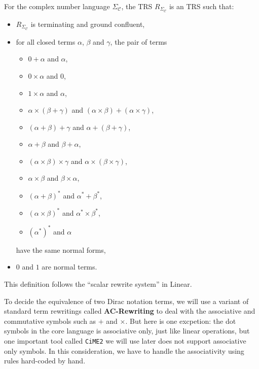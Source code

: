 \documentclass[manuscript, review, timestamp]{acmart}
\begin{document}
\begin{definition}
  For the complex number language $\Sigma_\mathcal{C}$, the TRS $R_{\Sigma_\mathcal{C}}$ is an TRS such that:
  \begin{itemize}
    \item $R_{\Sigma_\mathcal{C}}$ is terminating and ground confluent,
    \item for all closed terms $\alpha$, $\beta$ and $\gamma$, the pair of terms
    \begin{itemize}
        \item $0 + \alpha$ and $\alpha$,
        \item $0 \times \alpha$ and $0$,
        \item $1 \times \alpha$ and $\alpha$,
        \item $\alpha \times (\beta + \gamma)$ and $(\alpha \times \beta) + (\alpha \times \gamma)$,
        \item $(\alpha + \beta) + \gamma$ and $\alpha + (\beta + \gamma)$,
        \item $\alpha + \beta$ and $\beta + \alpha$,
        \item $(\alpha \times \beta) \times \gamma$ and $\alpha \times (\beta \times \gamma)$,
        \item $\alpha \times \beta$ and $\beta \times \alpha$,
        \item $(\alpha + \beta)^*$ and $\alpha^* + \beta^*$,
        \item $(\alpha \times \beta)^*$ and $\alpha^* \times \beta^*$,
        \item $(\alpha^*)^*$ and $\alpha$
    \end{itemize}
    have the same normal forms,
    \item $0$ and $1$ are normal terms.
  \end{itemize}  
\end{definition}

This definition follows the ``scalar rewrite system'' in Linear\cite{Arrighi2017}.


To decide the equivalence of two Dirac notation terms, we will use a variant of standard term rewritings called \textbf{AC-Rewriting} to deal with the associative and commutative symbols such as $+$ and $\times$. But here is one excpetion: the dot symbols in the core language is associative only, just like linear operations, but one important tool called \texttt{CiME2} we will use later does not support associative only symbols. In this consideration, we have to handle the associativity using rules hard-coded by hand.
\end{document}

